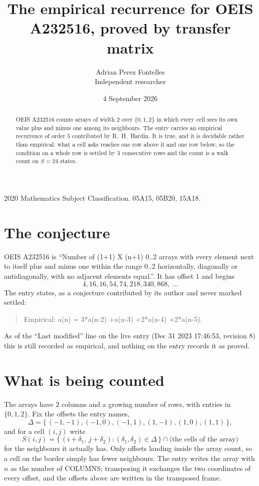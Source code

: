 \documentclass[11pt,a4paper]{article}
\title{The empirical recurrence for OEIS A232516, proved by transfer matrix}
\author{Adrian Perez Fontelles\\ \small Independent researcher}
\date{4 September 2026}
\theoremstyle{plain}
\theoremstyle{definition}
\begin{document}
\maketitle

\begin{abstract}
OEIS A232516 counts arrays of width $2$ over $\{0,1,2\}$ in which every cell sees its own value plus and minus one among its neighbours. The entry carries an
empirical recurrence of order $5$ contributed by R.~H.~Hardin. It is true, and it is
decidable rather than empirical: what a cell asks reaches one row above it and one row below, so the
condition on a whole row is settled by $3$ consecutive rows and the count is a walk
count on $S=24$ states.
\end{abstract}

\noindent\small 2020 Mathematics Subject Classification. 05A15, 05B20, 15A18.\normalsize

\section{The conjecture}

OEIS A232516 is ``Number of (1+1) X (n+1) 0..2 arrays with every element next to itself plus and minus one within the range 0..2 horizontally, diagonally or antidiagonally, with no adjacent elements equal.''. It has offset $1$ and begins
\[
4, 16, 16, 54, 74, 218, 340, 868,\ \dots
\]
The entry states, as a conjecture contributed by its author and never marked settled:
\begin{quote}
Empirical: a(n) = 3*a(n-2) +a(n-3) +2*a(n-4) +2*a(n-5).
\end{quote}
As of the ``Last modified'' line on the live entry (Dec 31 2023 17:46:53, revision 8) this is still
recorded as empirical, and nothing on the entry records it as proved.

\section{What is being counted}

The arrays have $2$ columns and a growing number of rows, with entries in $\{0,1,2\}$. Fix the
offsets the entry names,
\[
\Delta=\{\,(-1,-1), (-1,0), (-1,1), (1,-1), (1,0), (1,1)\,\},
\]
and for a cell $(i,j)$ write
\[
S(i,j)=\{\,(i+\delta_1,\,j+\delta_2) : (\delta_1,\delta_2)\in\Delta\,\}\cap
\text{(the cells of the array)}
\]
for the neighbours it actually has. Only offsets landing inside the array count, so a cell on
the border simply has fewer neighbours. The entry writes the array with $n$ as the number of COLUMNS; transposing it exchanges the two coordinates of every offset, and the offsets above are written in the transposed frame.
\end{document}

